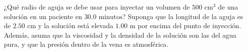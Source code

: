 \item ¿Qué radio de aguja se debe usar para inyectar un volumen de $500 \text{ cm}^3$ de una solución en un paciente en $30.0 \text{ minutos}$? Suponga que la longitud de la aguja es de $2.50 \text{ cm}$ y la solución está elevada $1.00 \text{ m}$ por encima del punto de inyección. Además, asuma que la viscosidad y la densidad de la solución son las del agua pura, y que la presión dentro de la vena es atmosférica.
